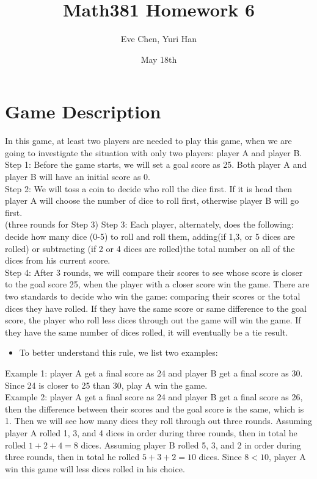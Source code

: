 \documentclass[12pt]{article}
\begin{document}
\title{\textbf{Math381 Homework 6}}%
\author{Eve Chen, Yuri Han} %
\date{\normalsize May 18th}
\maketitle
\section{Game Description}
In this game, at least two players are needed to play this game, when we are going to investigate the situation with only two players: player A and player B.\\

Step 1: Before the game starts, we will set a goal score as 25. Both player A and player B will have an initial score as 0.\\

Step 2: We will toss a coin to decide who roll the dice first. If it is head then player A will choose the number of dice to roll first, otherwise player B will go first.\\ 

(three rounds for Step 3)
Step 3: Each player, alternately, does the following: decide how many dice (0-5) to roll and roll them, adding(if 1,3, or 5 dices are rolled) or subtracting (if 2 or 4 dices are rolled)the total number on all of the dices from his current score.\\ 

Step 4: After 3 rounds, we will compare their scores to see whose score is closer to the goal score 25, when the player with a closer score win the game. There are two standards to decide who win the game: comparing their scores or the total dices they have rolled. If they have the same score or same difference to the goal score, the player who roll less dices through out the game will win the game. If they have the same number of dices rolled, it will eventually be a tie result.
\begin{itemize}
    \item To better understand this rule, we list two examples:
\end{itemize}

Example 1: player A get a final score as 24 and player B get a final score as 30. Since 24 is closer to 25 than 30, play A win the game.\\

Example 2: player A get a final score as 24 and player B get a final score as 26, then the difference between their scores and the goal score is the same, which is 1. Then we will see how many dices they roll through out three rounds. Assuming player A rolled 1, 3, and 4 dices in order during three rounds, then in total he rolled $1+2+4=8$ dices. Assuming player B rolled 5, 3, and 2 in order during three rounds, then in total he rolled $5+3+2=10$ dices. Since $8<10$, player A win this game will less dices rolled in his choice.\\
\end{document}
